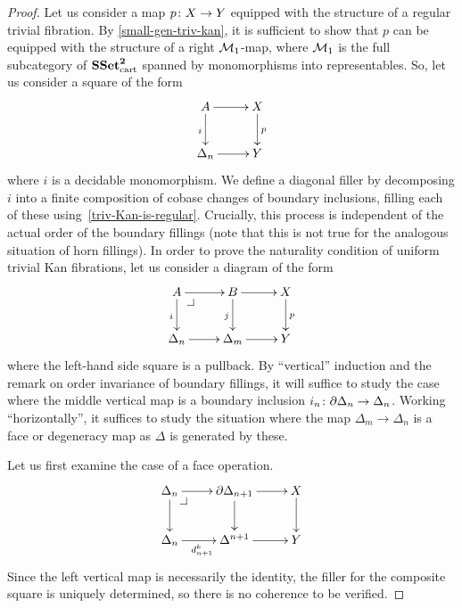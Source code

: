 \documentclass[reqno,10pt,a4paper,oneside]{amsart}
\begin{document}
\begin{proof} Let us consider a map $p \co X \to Y$ equipped with the structure of a 
regular trivial fibration. By \cref{small-gen-triv-kan}, it is sufficient to show that $p$
can be equipped with the structure of a right $\cal{M}_1$-map, where $\cal{M}_1$
is the full subcategory of $\SSet^{\mathbf{2}}_\cart$  spanned by monomorphisms into representables.
So, let us consider a square of the form
\[
\xymatrix{
A \ar[d]_i \ar[r] & X \ar[d]^p \\
\Delta_n \ar[r]  & Y }
\]
where $i$ is a decidable monomorphism. 
We define a diagonal filler by decomposing $i$ into a finite composition of cobase changes of boundary inclusions, filling each of these using~\cref{triv-Kan-is-regular}.
Crucially, this process is independent of the actual order of the boundary fillings (note that this is not true for the analogous situation of horn fillings). In order to prove the naturality condition of uniform trivial Kan fibrations, 
let us consider a diagram of the form
\[
\xymatrix{
  A
  \ar[r]
  \ar[d]_i
  \pullback{dr}
&
  B
  \ar[d]_j 
  \ar[r]
&
  X
  \ar[d]^p 
\\
  \Delta_{n}
  \ar[r]
&
  \Delta_{m}
  \ar[r]
&
  Y
}
\]
where the left-hand side square is a pullback. 
By ``vertical'' induction and the remark on order invariance of boundary fillings, it will suffice to study the case where the middle vertical map is a boundary inclusion $i_n \co \partial \Delta_n \to \Delta_n$.
Working ``horizontally'', it suffices to study the situation where the map $\Delta_{m} \to \Delta_n$ is a face or degeneracy map as $\Delta$ is generated by these.

Let us first examine the case of a face operation.
\[
\xymatrix{
  \Delta_n
  \ar[r]
  \ar[d]
  \pullback{dr}
&
  \partial \Delta_{n+1}
  \ar[d]
  \ar[r]
&
  X
  \ar[d]
\\
  \Delta_n
  \ar[r]_{d^k_{n+1}}
&
  \Delta^{n+1}
  \ar[r]
&
  Y
}
\]
Since the left vertical map is necessarily the identity, the filler for the composite square is uniquely determined, so there is no coherence to be verified.


\end{proof}
\end{document}
